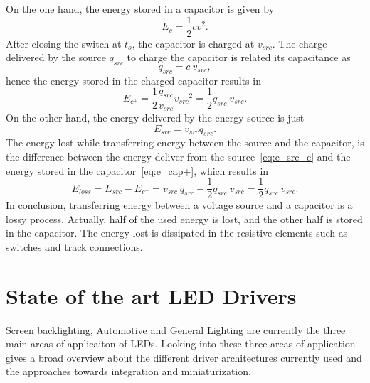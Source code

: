 On the one hand, the energy stored in a capacitor is given by
\begin{equation}
E_c = \frac{1}{2} c v^2.
\label{eq:e_cap}
\end{equation}
After closing the switch at $t_o$, the capacitor is charged at $v_{src}$.  The charge delivered by the source $q_{src}$ to charge the capacitor is related its capacitance as
\begin{equation}
q_{src}= c~v_{src},
\label{eq:q_src_cap}
\end{equation}
hence the energy stored in the charged capacitor results in
\begin{equation}
E_{c^+} = \frac{1}{2} \frac{q_{src}}{v_{src}}  {v_{src}}^2 = \frac{1}{2}q_{src}~v_{src}.
\label{eq:e_cap+}
\end{equation}
On the other hand, the energy delivered by the energy source is just
\begin{equation}
E_{src} = v_{src} q_{src}.
\label{eq:e_src_c}
\end{equation}
The energy lost while transferring energy between the source and the capacitor, is the difference between the energy deliver from the source~\eqref{eq:e_src_c} and the energy stored in the capacitor~\eqref{eq:e_cap+}, which results in
\begin{equation}
E_{loss} = E_{src} - E_{c^+} = v_{src}~q_{src}  - \frac{1}{2}q_{src}~v_{src}  = \frac{1}{2}q_{src}~v_{src}.
\label{eq:e_loss_l}
\end{equation}
In conclusion, transferring energy between a voltage source and a capacitor is a lossy process. Actually, half of the used energy is lost, and the other half is stored in the capacitor. The energy lost is dissipated in the resistive elements such as switches and  track connections.

\section{State of the art LED Drivers}
Screen backlighting, Automotive and General Lighting are currently the three main areas of applicaiton of LEDs. Looking into these three areas of application gives a broad overview about the different driver architectures currently used and the approaches towards integration and miniaturization.

